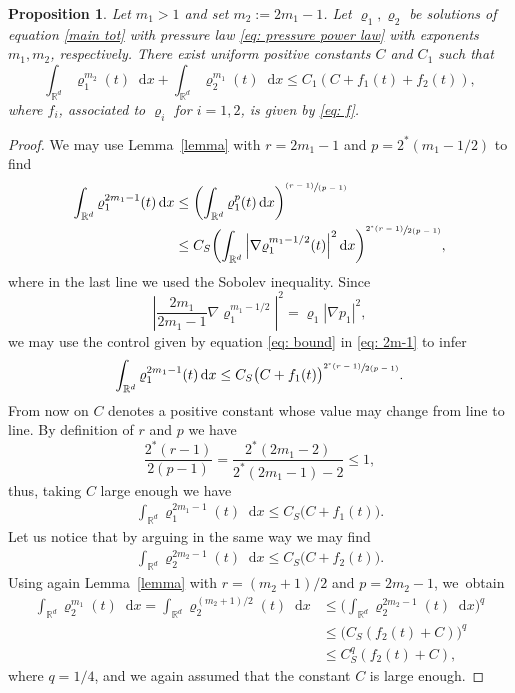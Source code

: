 \documentclass[11pt]{article}
\numberwithin{equation}{section}
\newcommand{\pspfrac}[2]{\sfrac{(#1)}{(#2)}}
\newcommand{\bprt}[1]{\bigl(#1\bigr)}
\newcommand{\bbprt}[1]{\biggl(#1\biggr)}
\newcommand{\dx}[1]{\mathop{}\!\mathrm{d} #1}
\newcommand{\R}{\mathbb{R}}
\theoremstyle{plain}
\newtheorem{proposition}[theorem]{Proposition}
\theoremstyle{remark}
\begin{document}
\begin{proposition}\label{prop: bounds of powers}
Let $m_{1}>1$ and set $m_2:=2m_1-1$. Let $\varrho_1, \varrho_2$ be solutions of equation \eqref{main tot} with pressure law \eqref{eq: pressure power law} with exponents $m_1,m_2$, respectively. There exist uniform positive constants $C$ and $C_1$ such that
\begin{equation*}
\int_{\R^d} \varrho_1^{m_2}(t) \dx x + \int_{\R^d} \varrho_2^{m_1}(t) \dx x \leq C_1(C + f_1(t)+f_2(t)),
\end{equation*}
where $f_i$, associated to $\varrho_i$ for $i=1,2$, is given by \eqref{eq: f}.
\end{proposition}

\begin{proof}
We may use Lemma~\ref{lemma} with $r=2m_1-1$ and $p=2^*(m_1 - 1/2)$ to find
\begin{equation}\label{eq: 2m-1}
\begin{aligned}
\int_{\R^d} \varrho_1^{2m_1-1}(t) \dx x &\leq \bbprt{\int_{\R^d} \varrho_1^{p}(t) \dx x}^{\pspfrac{r-1}{p-1}}\\
&\leq C_S \bbprt{\int_{\R^d} \left|\nabla \varrho_1^{m_1-1/2}(t)\right|^2 \dx x}^{\sfrac{2^*(r-1)}{2(p-1)}},
\end{aligned}
\end{equation}
where in the last line we used the Sobolev inequality.
Since
\begin{equation*}
\left|\frac{2m_{1}}{2{m_{1}}-1}\nabla \varrho_1^{m_1-1/2}\right|^2 = \varrho_1\left|\nabla p_1\right|^2,
\end{equation*}
we may use the control given by equation \eqref{eq: bound} in \eqref{eq: 2m-1} to infer
\begin{align*}
\int_{\R^d} \varrho_1^{2m_1-1}(t) \dx x \leq C_S\bprt{C+ {f_{1}}(t)}^{\sfrac{2^*(r-1)}{2(p-1)}}.
\end{align*}
From now on $C$ denotes a positive constant whose value may change from line to line. By definition of $r$ and $p$ we have
\begin{equation*}
\frac{2^*(r-1)}{2(p-1)}= \frac{2^* (2m_1 -2)}{2^* (2m_1 - 1) -2} \leq 1,
\end{equation*}
thus, taking $C$ large enough we have
\begin{align*}
\int_{\R^d} \varrho_1^{2 m_1-1}(t) \dx x \leq C_S\bprt{C+ {f_{1}}(t)}.
\end{align*}
Let us notice that by arguing in the same way we may find
\begin{align*}
\int_{\R^d} \varrho_2^{2 m_2-1}(t) \dx x \leq C_S\bprt{C+ {f_{2}}(t)}.
\end{align*}
Using again Lemma~\ref{lemma} with $r=(m_2+1)/2$ and $p=2m_2-1$, we~obtain
\begin{align*}
\int_{\R^d} \varrho_2^{m_1}(t) \dx x = \int_{\R^d} \varrho_2^{(m_2+1)/2}(t) \dx x
&\leq \bbprt{\int_{\R^d} \varrho_2^{2m_2-1}(t) \dx x }^{q}\\
&\leq \bprt{C_S({f_{2}}(t)+C)}^q\\
&\leq C_S^q({f_{2}}(t)+C),
\end{align*}
where $q=1/4$, and we again assumed that the constant $C$ is large enough.
\end{proof}
\end{document}
